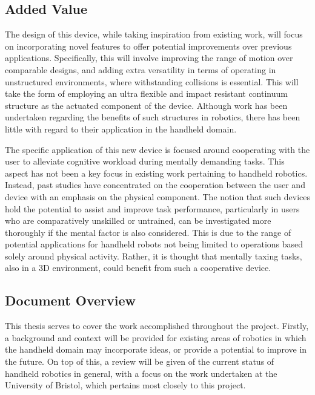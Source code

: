 \documentclass[11pt]{article}
\begin{document}
\subsection{Added Value}
The design of this device, while taking inspiration from existing work, will focus on incorporating novel features to offer potential improvements over previous applications. Specifically, this will involve improving the range of motion over comparable designs, and adding extra versatility in terms of operating in unstructured environments, where withstanding collisions is essential. This will take the form of employing an ultra flexible and impact resistant continuum structure as the actuated component of the device. Although work has been undertaken regarding the benefits of such structures in robotics, there has been little with regard to their application in the handheld domain.

The specific application of this new device is focused around cooperating with the user to alleviate cognitive workload during mentally demanding tasks. This aspect has not been a key focus in existing work pertaining to handheld robotics. Instead, past studies have concentrated on the cooperation between the user and device with an emphasis on the physical component. The notion that such devices hold the potential to assist and improve task performance, particularly in users who are comparatively unskilled or untrained, can be investigated more thoroughly if the mental factor is also considered. This is due to the range of potential applications for handheld robots not being limited to operations based solely around physical activity. Rather, it is thought that mentally taxing tasks, also in a 3D environment, could benefit from such a cooperative device.

\subsection{Document Overview}
This thesis serves to cover the work accomplished throughout the project. Firstly, a background and context will be provided for existing areas of robotics in which the handheld domain may incorporate ideas, or provide a potential to improve in the future. On top of this, a review will be given of the current status of handheld robotics in general, with a focus on the work undertaken at the University of Bristol, which pertains most closely to this project.
\end{document}
